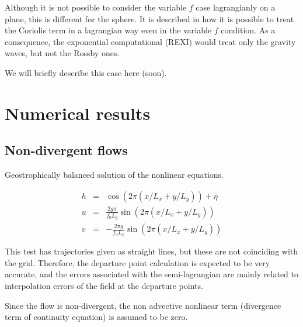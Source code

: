 \documentclass[10pt,a4paper]{article}
\begin{document}
Although it is not possible to consider the variable $f$ case lagrangianly on a plane, this is different for the sphere. It is described in \cite{Temperton1997} how it is possible to treat the Coriolis term in a lagrangian way even in the variable $f$ condition. As a consequence, the exponential computational (REXI) would treat only the gravity waves, but not the Rossby ones.

We will briefly describe this case here (soon).

\section{Numerical results}


\subsection{Non-divergent flows}

Geostrophically balanced solution of the nonlinear equations.

\begin{eqnarray}
h&=&\cos\left( 2 \pi (x/L_x+y/L_y)\right)+ \bar{\eta}\\
u&=&\frac{2 g \pi}{f_0 L_y} \sin\left( 2 \pi (x/L_x+y/L_y)\right)\\
v&=&-\frac{2 \pi g}{f_0 L_x} \sin\left( 2 \pi (x/L_x+y/L_y)\right)
\end{eqnarray}

This test has trajectories given as straight lines, but these are not coinciding with the grid. Therefore, the departure point calculation is expected to be very accurate, and the errors associated with the semi-lagrangian are mainly related to interpolation errors of the field at the departure points. 

Since the flow is non-divergent, the non advective nonlinear term (divergence term of continuity equation) is assumed to be zero.
\end{document}
